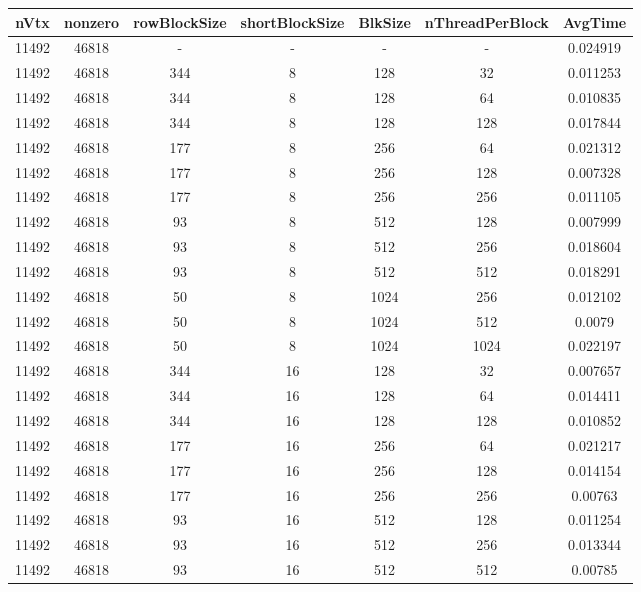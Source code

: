 \documentclass[9pt]{article}
\begin{document}
\SetBgPosition{0.25cm,-5.0cm}
\begin{tabular}{|c|c|c|c|c|c|c| }  
\hline
nVtx  & nonzero  & rowBlockSize  & shortBlockSize  & BlkSize  & nThreadPerBlock  & AvgTime \\
\hline
11492  & 46818  &  -  & -  & -  & -  &0.024919 \\
\hline
11492  & 46818  & 344  & 8  & 128  & 32  & 0.011253 \\
\hline
11492  & 46818  & 344  & 8  & 128  & 64  & 0.010835 \\
\hline
11492  & 46818  & 344  & 8  & 128  & 128  & 0.017844 \\
\hline
11492  & 46818  & 177  & 8  & 256  & 64  & 0.021312 \\
\hline
11492  & 46818  & 177  & 8  & 256  & 128  & 0.007328 \\
\hline
11492  & 46818  & 177  & 8  & 256  & 256  & 0.011105 \\
\hline
11492  & 46818  & 93  & 8  & 512  & 128  & 0.007999 \\
\hline
11492  & 46818  & 93  & 8  & 512  & 256  & 0.018604 \\
\hline
11492  & 46818  & 93  & 8  & 512  & 512  & 0.018291 \\
\hline
11492  & 46818  & 50  & 8  & 1024  & 256  & 0.012102 \\
\hline
11492  & 46818  & 50  & 8  & 1024  & 512  & 0.0079 \\
\hline
11492  & 46818  & 50  & 8  & 1024  & 1024  & 0.022197 \\
\hline
11492  & 46818  & 344  & 16  & 128  & 32  & 0.007657 \\
\hline
11492  & 46818  & 344  & 16  & 128  & 64  & 0.014411 \\
\hline
11492  & 46818  & 344  & 16  & 128  & 128  & 0.010852 \\
\hline
11492  & 46818  & 177  & 16  & 256  & 64  & 0.021217 \\
\hline
11492  & 46818  & 177  & 16  & 256  & 128  & 0.014154 \\
\hline
11492  & 46818  & 177  & 16  & 256  & 256  & 0.00763 \\
\hline
11492  & 46818  & 93  & 16  & 512  & 128  & 0.011254 \\
\hline
11492  & 46818  & 93  & 16  & 512  & 256  & 0.013344 \\
\hline
11492  & 46818  & 93  & 16  & 512  & 512  & 0.00785 \\

\end{tabular}
\end{document}
